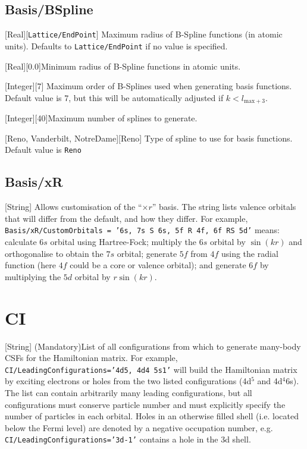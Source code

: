 \documentclass{report}
\begin{document}
\subsection{Basis/BSpline}

[Real][\texttt{Lattice/EndPoint}]{%
Maximum radius of B-Spline functions (in atomic units). Defaults to \texttt{Lattice/EndPoint} if no
value is specified.%
}

[Real][0.0]{Minimum radius of B-Spline functions in atomic units.}

[Integer][7]{%
Maximum order of B-Splines used when generating basis functions. Default value is 7, but this will be
automatically adjusted if $k < l_{\mathrm{max} + 3}$.%
}

[Integer][40]{Maximum number of splines to generate.}

[Reno, Vanderbilt, NotreDame][Reno]{%
Type of spline to use for basis functions. Default value is \texttt{Reno}%
}

\subsection{Basis/xR}

[String]{%
Allows customisation of the ``$\times r$'' basis. The string lists valence orbitals that will differ from the default, and how they differ. For example, \texttt{Basis/xR/CustomOrbitals = '6s, 7s S 6s, 5f R 4f, 6f RS 5d'} means: calculate $6s$ orbital using Hartree-Fock; multiply the $6s$ orbital by $\sin(kr)$ and orthogonalise to obtain the $7s$ orbital; generate $5f$ from $4f$ using the radial function (here $4f$ could be a core or valence orbital); and generate $6f$ by multiplying the $5d$ orbital by $r\sin(kr)$.%
}

\section{CI}

[String]{%
(Mandatory)List of all configurations from which to generate many-body CSFs for the
Hamiltonian matrix. For example, \texttt{CI/LeadingConfigurations='4d5, 4d4 5s1'} will build the
Hamiltonian matrix by exciting electrons or holes from the two listed configurations (4d$^5$ and
4d$^4$6s). The list can contain arbitrarily many leading configurations, but all configurations must
conserve particle number and must explicitly specify the number of particles in each orbital. Holes in
an otherwise filled shell (i.e. located below the Fermi level) are denoted by a negative occupation
number, e.g. \texttt{CI/LeadingConfigurations='3d-1'} contains a hole in the 3d shell.%
}
\end{document}
